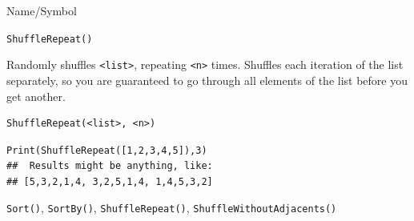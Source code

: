 \begin{desc}{Name/Symbol}
\item[Name/Symbol] 	\verb+ShuffleRepeat()+

\item[Description] 	Randomly shuffles  \verb+<list>+, repeating \verb+<n>+ times.  Shuffles
  each iteration of the list separately, so you are guaranteed to go
  through all elements of the list before you get another.

\item[Usage]    
\begin{verbatim}
ShuffleRepeat(<list>, <n>)
\end{verbatim}

\item[Example]
\begin{verbatim}
Print(ShuffleRepeat([1,2,3,4,5]),3)
##  Results might be anything, like:
## [5,3,2,1,4, 3,2,5,1,4, 1,4,5,3,2]
\end{verbatim}

\item[See Also]    	\verb+Sort()+, \verb+SortBy()+, \verb+ShuffleRepeat()+,
                    \verb+ShuffleWithoutAdjacents()+
\end{desc}


